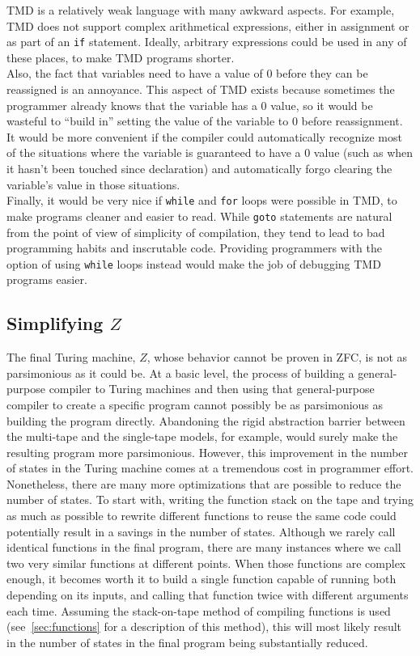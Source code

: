 TMD is a relatively weak language with many awkward aspects. For example, TMD does not support complex arithmetical expressions, either in assignment or as part of an \texttt{if} statement. Ideally, arbitrary expressions could be used in any of these places, to make TMD programs shorter. \\

Also, the fact that variables need to have a value of 0 before they can be reassigned is an annoyance. This aspect of TMD exists because sometimes the programmer already knows that the variable has a 0 value, so it would be wasteful to ``build in'' setting the value of the variable to 0 before reassignment. It would be more convenient if the compiler could automatically recognize most of the situations where the variable is guaranteed to have a 0 value (such as when it hasn't been touched since declaration) and automatically forgo clearing the variable's value in those situations. \\

Finally, it would be very nice if \texttt{while} and \texttt{for} loops were possible in TMD, to make programs cleaner and easier to read. While \texttt{goto} statements are natural from the point of view of simplicity of compilation, they tend to lead to bad programming habits and inscrutable code. Providing programmers with the option of using \texttt{while} loops instead would make the job of debugging TMD programs easier. 

\subsection{Simplifying $Z$}

The final Turing machine, $Z$, whose behavior cannot be proven in ZFC, is not as parsimonious as it could be. At a basic level, the process of building a general-purpose compiler to Turing machines and then using that general-purpose compiler to create a specific program cannot possibly be as parsimonious as building the program directly. Abandoning the rigid abstraction barrier between the multi-tape and the single-tape models, for example, would surely make the resulting program more parsimonious. However, this improvement in the number of states in the Turing machine comes at a tremendous cost in programmer effort. \\

Nonetheless, there are many more optimizations that are possible to reduce the number of states. To start with, writing the function stack on the tape and trying as much as possible to rewrite different functions to reuse the same code could potentially result in a savings in the number of states. Although we rarely call identical functions in the final program, there are many instances where we call two very similar functions at different points. When those functions are complex enough, it becomes worth it to build a single function capable of running both depending on its inputs, and calling that function twice with different arguments each time. Assuming the stack-on-tape method of compiling functions is used (see~\ref{sec:functions} for a description of this method), this will most likely result in the number of states in the final program being substantially reduced. 

